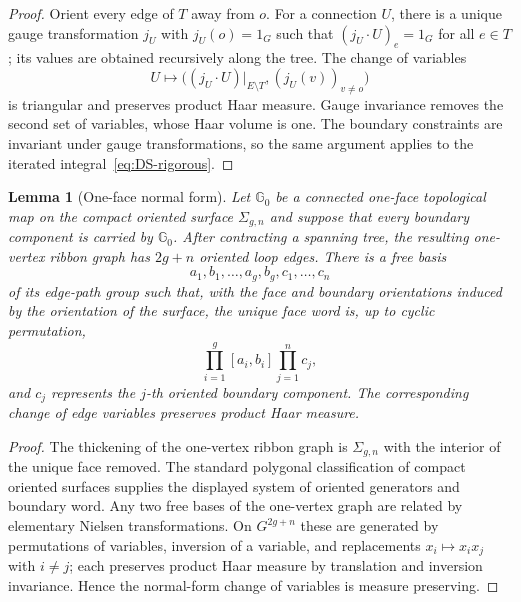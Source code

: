 \documentclass[11pt,a4paper,reqno]{article}
\newtheorem{lemma}[theorem]{Lemma}
\theoremstyle{definition}
\theoremstyle{remark}
\begin{document}
\begin{proof}
Orient every edge of $T$ away from $o$. For a connection $U$, there is a
unique gauge transformation $j_U$ with $j_U(o)=1_G$ such that
$(j_U\cdot U)_e=1_G$ for all $e\in T$; its values are obtained recursively
along the tree. The change of variables
\[
 U\longmapsto\bigl((j_U\cdot U)|_{E\setminus T},
 (j_U(v))_{v\ne o}\bigr)
\]
is triangular and preserves product Haar measure. Gauge invariance removes
the second set of variables, whose Haar volume is one. The boundary
constraints are invariant under gauge transformations, so the same argument
applies to the iterated integral~\eqref{eq:DS-rigorous}.
\end{proof}

\begin{lemma}[One-face normal form]\label{lem:one-face-normal-form}
Let $\mathbb G_0$ be a connected one-face topological map on the compact
oriented surface $\Sigma_{g,n}$ and suppose that every boundary component is
carried by $\mathbb G_0$. After contracting a spanning tree, the resulting
one-vertex ribbon graph has $2g+n$ oriented loop edges. There is a free basis
\[
 a_1,b_1,\ldots,a_g,b_g,c_1,\ldots,c_n
\]
of its edge-path group such that, with the face and boundary orientations induced by the orientation of the surface, the unique face word is, up to cyclic
permutation,
\[
 \prod_{i=1}^g[a_i,b_i]\prod_{j=1}^n c_j,
\]
and $c_j$ represents the $j$-th oriented boundary component. The
corresponding change of edge variables preserves product Haar measure.
\end{lemma}

\begin{proof}
The thickening of the one-vertex ribbon graph is $\Sigma_{g,n}$ with the
interior of the unique face removed. The standard polygonal classification
of compact oriented surfaces supplies the displayed system of oriented
generators and boundary word. Any two free bases of the one-vertex graph are
related by elementary Nielsen transformations. On $G^{2g+n}$ these are
generated by permutations of variables, inversion of a variable, and
replacements $x_i\mapsto x_ix_j$ with $i\ne j$; each preserves product Haar
measure by translation and inversion invariance. Hence the normal-form
change of variables is measure preserving.
\end{proof}
\end{document}

